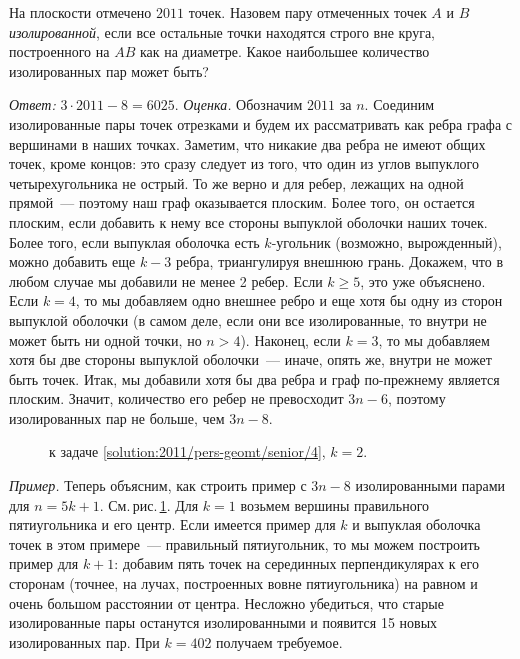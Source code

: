 \problem
На плоскости отмечено $2011$ точек.
Назовем пару отмеченных точек $A$ и $B$ \emph{изолированной}, если все остальные
точки находятся строго вне круга, построенного на $AB$ как на диаметре.
Какое наибольшее количество изолированных пар может быть?

\solution
\label{solution:2011/pers-geomt/senior/4}%
\emph{Ответ:}
$3 \cdot 2011 - 8 = 6025$.
\emph{Оценка.}
Обозначим $2011$ за $n$.
Соединим изолированные пары точек отрезками и будем их рассматривать как ребра
графа с вершинами в наших точках.
Заметим, что никакие два ребра не имеют общих точек, кроме концов:
это сразу следует из того, что один из углов выпуклого четырехугольника не
острый.
То же верно и для ребер, лежащих на одной прямой~--- поэтому наш граф
оказывается плоским.
Более того, он остается плоским, если добавить к нему все стороны выпуклой
оболочки наших точек.
Более того, если выпуклая оболочка есть $k$-угольник (возможно, вырожденный),
можно добавить еще $k - 3$ ребра, триангулируя внешнюю грань.
Докажем, что в любом случае мы добавили не менее 2 ребер.
Если $k \geq 5$, это уже объяснено.
Если $k = 4$, то мы добавляем одно внешнее ребро и еще хотя бы одну из сторон
выпуклой оболочки
(в самом деле, если они все изолированные, то внутри не может быть ни одной
точки, но $n > 4$).
Наконец, если $k = 3$, то мы добавляем хотя бы две стороны выпуклой
оболочки~--- иначе, опять же, внутри не может быть точек.
Итак, мы добавили хотя бы два ребра и граф по-прежнему является плоским.
Значит, количество его ребер не превосходит $3 n - 6$, поэтому изолированных
пар не больше, чем $3 n - 8$.
\\
\begin{figure}
\centering
\caption{к задаче \ref{solution:2011/pers-geomt/senior/4}, $k = 2$.}
\label{fig:solution:2011/pers-geomt/senior/4}
\end{figure}%
\emph{Пример.}
Теперь объясним, как строить пример с $3 n - 8$ изолированными парами для
$n = 5 k + 1$.
См.\,рис.\,\ref{fig:solution:2011/pers-geomt/senior/4}.
Для $k = 1$ возьмем вершины правильного пятиугольника и его центр.
Если имеется пример для $k$ и выпуклая оболочка точек в этом примере~---
правильный пятиугольник, то мы можем построить пример для $k + 1$:
добавим пять точек на серединных перпендикулярах к его сторонам (точнее, на
лучах, построенных вовне пятиугольника) на равном и очень большом расстоянии от
центра.
Несложно убедиться, что старые изолированные пары останутся изолированными и
появится 15 новых изолированных пар.
При $k = 402$ получаем требуемое.

\endproblem
